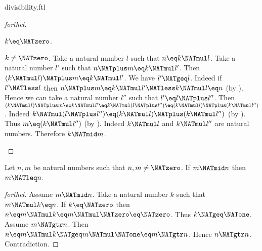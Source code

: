 \documentclass{naproche-library}
\begin{document}
\begin{smodule}[title=Divisibility]{divisibility.ftl}
\begin{proof}[forthel]
  \begin{case}{$k \eq \NATzero$.} \end{case}

  \begin{case}{$k \neq \NATzero$.}
    Take a natural number $l$ such that $n \eq k \NATmul l$.
    Take a natural number $l'$ such that $n \NATplus m \eq k \NATmul l'$.
    Then $(k \NATmul l) \NATplus m \eq k \NATmul l'$.
    We have $l' \NATgeq l$.
    Indeed if $l' \NATless l$ then
    $n \NATplus m
      \eq k \NATmul l'
      \NATless k \NATmul l
      \eq n$ (by ).
    Hence we can take a natural number $l''$ such that $l' \eq l \NATplus l''$.
    Then $(k \NATmul l) \NATplus m
      \eq k \NATmul l'
      \eq k \NATmul (l \NATplus l'')
      \eq (k \NATmul l) \NATplus (k \NATmul l'')$.
    Indeed $k \NATmul (l \NATplus l'') \eq (k \NATmul l) \NATplus (k \NATmul l'')$ (by ).
    Thus $m \eq (k \NATmul l'')$ (by ).
    Indeed $k \NATmul l$ and $k \NATmul l''$ are natural numbers.
    Therefore $k \NATmid m$.
  \end{case}
\end{proof}

\begin{proposition}[forthel,id=ARITHMETIC_07_2187144577679360]
  Let $n, m$ be natural numbers such that $n, m \neq \NATzero$.
  If $m \NATmid n$ then $m \NATleq n$.
\end{proposition}
\begin{proof}[forthel]
  Assume $m \NATmid n$.
  Take a natural number $k$ such that $m \NATmul k \eq n$.
  If $k \eq \NATzero$ then
  $n
    \eq m \NATmul k
    \eq m \NATmul \NATzero
    \eq \NATzero$.
  Thus $k \NATgeq \NATone$.
  Assume $m \NATgtr n$.
  Then $n
    \eq m \NATmul k
    \NATgeq m \NATmul \NATone
    \eq m
    \NATgtr n$.
  Hence $n \NATgtr n$.
  Contradiction.
\end{proof}
\end{smodule}
\end{document}
